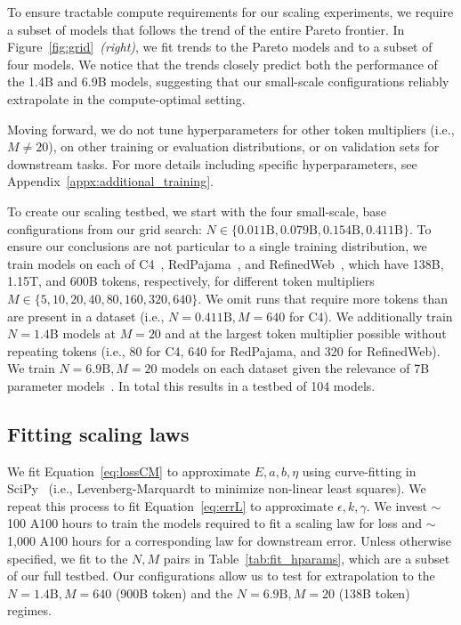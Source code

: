 To ensure tractable compute requirements for our scaling experiments, we require a subset of models that follows the trend of the entire Pareto frontier.
In Figure~\ref{fig:grid}~\emph{(right)}, we fit trends to the Pareto models and to a subset of four models.
We notice that the trends closely predict both the performance of the 1.4B and 6.9B models, suggesting that our small-scale configurations reliably extrapolate in the compute-optimal setting.

Moving forward, we do not tune hyperparameters for other token multipliers (i.e., $M \neq 20$), on other training or evaluation distributions, or on validation sets for downstream tasks.
For more details including specific hyperparameters, see Appendix~\ref{appx:additional_training}.

To create our scaling testbed, we start with the four small-scale, base configurations from our grid search: $N\in \{0.011\text{B}, 0.079\text{B}, 0.154\text{B}, 0.411\text{B}\}$.
To ensure our conclusions are not particular to a single training distribution, we train models on each of C4~\cite{c4,c4_ai2}, RedPajama~\cite{rpj}, and RefinedWeb~\cite{refinedweb}, which have 138B, 1.15T, and 600B tokens, respectively, for different token multipliers $M \in \{5, 10, 20, 40, 80, 160, 320, 640\}$.
We omit runs that require more tokens than are present in a dataset (i.e., $N=0.411\text{B}, M=640$ for C4).
We additionally train $N=1.4$B models at $M=20$ and at the largest token multiplier possible without repeating tokens (i.e., 80 for C4, 640 for RedPajama, and 320 for RefinedWeb).
We train $N=6.9\text{B}, M=20$ models on each dataset given the relevance of 7B parameter models~\citep{llama,jiang2023mistral}.
In total this results in a testbed of 104 models.

\subsection{Fitting scaling laws}
\label{sec:fitting}


We fit Equation~\eqref{eq:lossCM} to approximate $E, a, b, \eta$ using curve-fitting in SciPy~\cite{scipy} (i.e., Levenberg-Marquardt to minimize non-linear least squares).
We repeat this process to fit Equation~\eqref{eq:errL} to approximate $\epsilon, k, \gamma$.
We invest $\sim$100 A100 hours to train the models required to fit a scaling law for loss and $\sim$1,000 A100 hours for a corresponding law for downstream error.
Unless otherwise specified, we fit to the $N, M$ pairs in Table~\ref{tab:fit_hparams}, which are a subset of our full testbed.
Our configurations allow us to test for extrapolation to the $N=1.4\text{B}, M=640$ (900B token) and the $N=6.9\text{B}, M=20$ (138B token) regimes.

